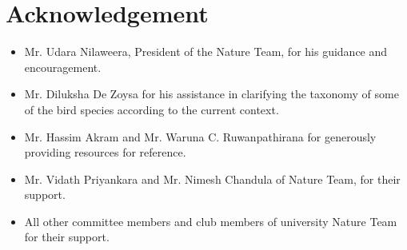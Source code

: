 \chapter{Acknowledgement}
\label{cp:Acknowledgement}
\begin{itemize}
    \item Mr. Udara Nilaweera, President of the Nature Team, for his guidance and encouragement.\\
    \item Mr. Diluksha De Zoysa for his assistance in clarifying the taxonomy of some of the bird species according to the current context.\\
    \item Mr. Hassim Akram and Mr. Waruna C. Ruwanpathirana for generously providing resources for reference.\\
    \item Mr. Vidath Priyankara and Mr. Nimesh Chandula of Nature Team, for their  support.
    \\
    \item All other committee members and club members of university Nature Team for their support.
\end{itemize}